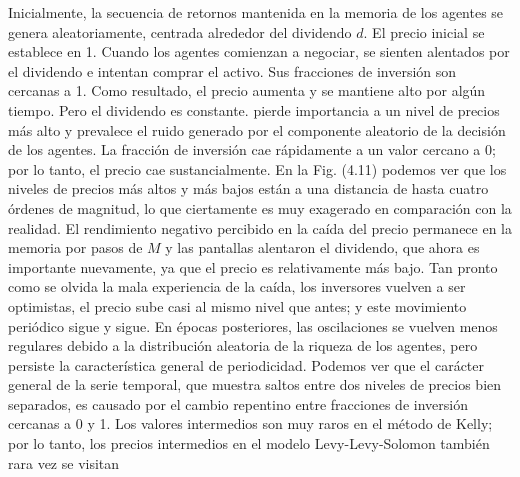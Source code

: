 \documentclass[12pt,a4paper]{article}
\begin{document}
\quad Inicialmente, la secuencia de retornos mantenida en la memoria de los agentes se genera aleatoriamente, centrada alrededor del dividendo $ d $. El precio inicial se establece en 1. Cuando los agentes comienzan a negociar, se sienten alentados por el dividendo e intentan comprar el activo. Sus fracciones de inversión son cercanas a 1. Como resultado, el precio aumenta y se mantiene alto por algún tiempo. Pero el dividendo es constante. pierde importancia a un nivel de precios más alto y prevalece el ruido generado por el componente aleatorio de la decisión de los agentes. La fracción de inversión cae rápidamente a un valor cercano a 0; por lo tanto, el precio cae sustancialmente. En la Fig. (4.11) podemos ver que los niveles de precios más altos y más bajos están a una distancia de hasta cuatro órdenes de magnitud, lo que ciertamente es muy exagerado en comparación con la realidad. El rendimiento negativo percibido en la caída del precio permanece en la memoria por pasos de $ M $ y las pantallas alentaron el dividendo, que ahora es importante nuevamente, ya que el precio es relativamente más bajo. Tan pronto como se olvida la mala experiencia de la caída, los inversores vuelven a ser optimistas, el precio sube casi al mismo nivel que antes; y este movimiento periódico sigue y sigue. En épocas posteriores, las oscilaciones se vuelven menos regulares debido a la distribución aleatoria de la riqueza de los agentes, pero persiste la característica general de periodicidad. Podemos ver que el carácter general de la serie temporal, que muestra saltos entre dos niveles de precios bien separados, es causado por el cambio repentino entre fracciones de inversión cercanas a 0 y 1. Los valores intermedios son muy raros en el método de Kelly; por lo tanto, los precios intermedios en el modelo Levy-Levy-Solomon también rara vez se visitan
\end{document}
